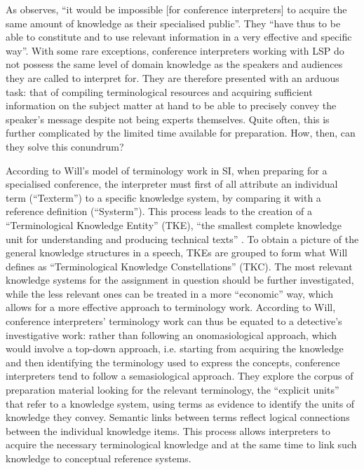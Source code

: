 As \citet[65]{will_terminology_2007} observes, ``it would be impossible [for conference interpreters] to acquire the same amount of knowledge as their specialised public''. They ``have thus to be able to constitute and to use relevant information in a very effective and specific way''. With some rare exceptions, conference interpreters working with LSP do not possess the same level of domain knowledge as the speakers and audiences they are called to interpret for. They are therefore presented with an arduous task: that of compiling terminological resources and acquiring sufficient information on the subject matter at hand to be able to precisely convey the speaker's message despite not being experts themselves. Quite often, this is further complicated by the limited time available for preparation. How, then, can they solve this conundrum?

According to Will's model of terminology work in SI, when preparing for a specialised conference, the interpreter must first of all attribute an individual term (``Texterm'') to a specific knowledge system, by comparing it with a reference definition (``Systerm''). This process leads to the creation of a ``Terminological Knowledge Entity'' (TKE), ``the smallest complete knowledge unit for understanding and producing technical texts'' \citep[69]{will_terminology_2007}. To obtain a picture of the general knowledge structures in a speech, TKEs are grouped to form what Will defines as ``Terminological Knowledge Constellations'' (TKC). The most relevant knowledge systems for the assignment in question should be further investigated, while the less relevant ones can be treated in a more ``economic'' way, which allows for a more effective approach to terminology work. According to Will, conference interpreters' terminology work can thus be equated to a detective's investigative work: rather than following an onomasiological approach, which would involve a top-down approach, i.e. starting from acquiring the knowledge and then identifying the terminology used to express the concepts, conference interpreters tend to follow a semasiological approach. They explore the corpus of preparation material looking for the relevant terminology, the ``explicit units'' that refer to a knowledge system, using terms as evidence to identify the units of knowledge they convey. Semantic links between terms reflect logical connections between the individual knowledge items. This process allows interpreters to acquire the necessary terminological knowledge and at the same time to link such knowledge to conceptual reference systems.

